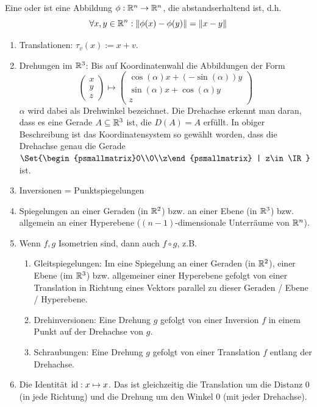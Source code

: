 \begin{definition}
Eine  oder  ist eine Abbildung $\phi:\mathbb{R}^n\to\mathbb{R}^n$, die abstandserhaltend ist, d.h.
\[\forall x,y\in\mathbb{R}^n: \lVert\phi(x)-\phi(y)\rVert = \lVert x-y\rVert\]
\end{definition}

\begin{example}
\begin{enumerate}
\item Translationen: $\tau_v(x) := x+v$.
\item Drehungen im $\mathbb{R}^3$: Bis auf Koordinatenwahl die Abbildungen der Form
\[\begin{pmatrix}x\\y\\z\end{pmatrix}\mapsto\begin{pmatrix}
\cos(\alpha)x + (-\sin(\alpha)) y \\
\sin(\alpha)x + \cos(\alpha)y \\
z
\end{pmatrix}\]
$\alpha$ wird dabei als Drehwinkel bezeichnet. Die Drehachse erkennt man daran, dass es eine Gerade $A\subseteq\mathbb{R}^3$ ist, die $D(A)=A$ erfüllt. In obiger Beschreibung ist das Koordinatensystem so gewählt worden, dass die Drehachse genau die Gerade $\Set{\begin{psmallmatrix}0\\0\\z\end{psmallmatrix} | z\in\IR}$ ist.
\item Inversionen = Punktspiegelungen
\item Spiegelungen an einer Geraden (in $\mathbb{R}^2$) bzw. an einer Ebene (in $\mathbb{R}^3$) bzw. allgemein an einer Hyperebene ($(n-1)$-dimensionale Unterräume von $\mathbb{R}^n$).
\item Wenn $f,g$ Isometrien sind, dann auch $f\circ g$, z.B.
\begin{enumerate}
\item Gleitspiegelungen: Im eine Spiegelung an einer Geraden (in $\mathbb{R}^2$), einer Ebene (im $\mathbb{R}^3$) bzw. allgemeiner einer Hyperebene gefolgt von einer Translation in Richtung eines Vektors parallel zu dieser Geraden / Ebene / Hyperebene.
\item Drehinversionen: Eine Drehung $g$ gefolgt von einer Inversion $f$ in einem Punkt auf der Drehachse von $g$.
\item Schraubungen: Eine Drehung $g$ gefolgt von einer Translation $f$ entlang der Drehachse.
\end{enumerate}
\item Die Identität $\operatorname{id}: x\mapsto x$. Das ist gleichzeitig die Translation um die Distanz $0$ (in jede Richtung) und die Drehung um den Winkel $0$ (mit jeder Drehachse).
\end{enumerate}
\end{example}


